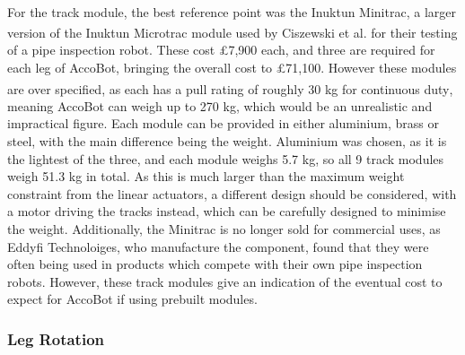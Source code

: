 \documentclass[11pt]{article}		%
\newcommand{\supercite}[1]{\textsuperscript{\cite{#1}}}		%
\begin{document}
				\\
                \hspace*{2ex}For the track module, the best reference point was the Inuktun Minitrac, a larger version of the Inuktun Microtrac module used by Ciszewski et al.\supercite{ciszewski2015design} for their testing of a pipe inspection robot.
				These cost £7,900 each, and three are required for each leg of AccoBot, bringing the overall cost to £71,100.
				However these modules are over specified, as each has a pull rating of roughly 30 kg for continuous duty\supercite{inuktunTracks}, meaning AccoBot can weigh up to 270 kg, which would be an unrealistic and impractical figure.
				Each module can be provided in either aluminium, brass or steel, with the main difference being the weight.
				Aluminium was chosen, as it is the lightest of the three, and each module weighs 5.7 kg, so all 9 track modules weigh 51.3 kg in total.
				As this is much larger than the maximum weight constraint from the linear actuators, a different design should be considered, with a motor driving the tracks instead, which can be carefully designed to minimise the weight.
				Additionally, the Minitrac is no longer sold for commercial uses, as Eddyfi Technoloiges, who manufacture the component, found that they were often being used in products which compete with their own pipe inspection robots.
				However, these track modules give an indication of the eventual cost to expect for AccoBot if using prebuilt modules.
				
			\subsubsection{Leg Rotation}
				
\end{document}
